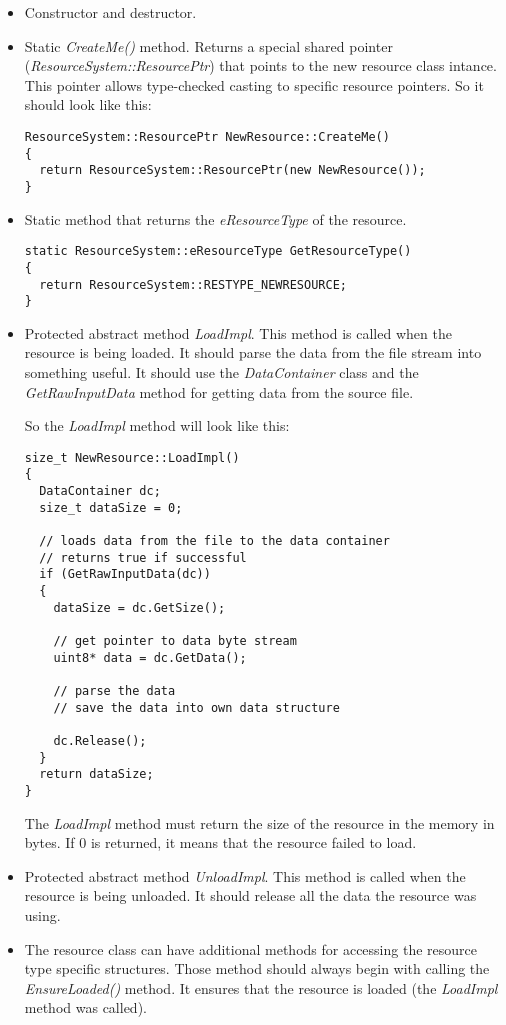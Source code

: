 \documentclass[a4paper, 12pt]{report}
\begin{document}
\begin{itemize}
\item
Constructor and destructor.
\item
Static \emph{CreateMe()} method. Returns a special shared pointer (\emph{ResourceSystem::ResourcePtr}) that points to the new resource class intance. This pointer allows type-checked casting to specific resource pointers. So it should look like this:

\footnotesize 
\begin{verbatim}
ResourceSystem::ResourcePtr NewResource::CreateMe()
{
  return ResourceSystem::ResourcePtr(new NewResource());
}
\end{verbatim}
\normalsize

\item
Static method that returns the \emph{eResourceType} of the resource.

\footnotesize 
\begin{verbatim}
static ResourceSystem::eResourceType GetResourceType() 
{ 
  return ResourceSystem::RESTYPE_NEWRESOURCE; 
}
\end{verbatim}
\normalsize

\item
Protected abstract method \emph{LoadImpl}. This method is called when the resource is being loaded. It should parse the data from the file stream into something useful. It should use the \emph{DataContainer} class and the \emph{GetRawInputData} method for getting data from the source file.

So the \emph{LoadImpl} method will look like this:

\footnotesize 
\begin{verbatim}
size_t NewResource::LoadImpl()
{
  DataContainer dc;
  size_t dataSize = 0;

  // loads data from the file to the data container
  // returns true if successful
  if (GetRawInputData(dc))	
  {
    dataSize = dc.GetSize();

    // get pointer to data byte stream
    uint8* data = dc.GetData();

    // parse the data
    // save the data into own data structure

    dc.Release();
  }
  return dataSize;
}
\end{verbatim}
\normalsize

The \emph{LoadImpl} method must return the size of the resource in the memory in bytes. If 0 is returned, it means that the resource failed to load.

\item
Protected abstract method \emph{UnloadImpl}. This method is called when the resource is being unloaded. It should release all the data the resource was using.

\item
The resource class can have additional methods for accessing the resource type specific structures. Those method should always begin with calling the \emph{EnsureLoaded()} method. It ensures that the resource is loaded (the \emph{LoadImpl} method was called).

\end{itemize}
\end{document}
